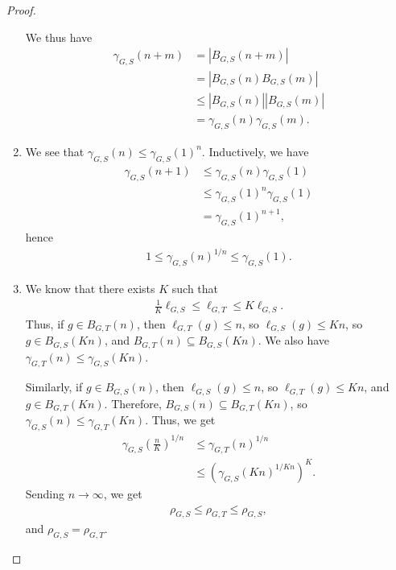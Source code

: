 \documentclass[10pt]{mypackage}
\begin{document}
\begin{proof}
\begin{enumerate}[(1)]
      We thus have
      \begin{align*}
        \gamma_{G,S}\left(n+m\right) &= \left\vert B_{G,S}\left(n+m\right) \right\vert\\
                                     &= \left\vert B_{G,S}\left(n\right)B_{G,S}\left(m\right) \right\vert\\
                                     &\leq \left\vert B_{G,S}\left(n\right) \right\vert\left\vert B_{G,S}\left(m\right) \right\vert\\
                                     &= \gamma_{G,S}\left(n\right)\gamma_{G,S}\left(m\right).
      \end{align*}
    \item We see that $\gamma_{G,S}\left(n\right) \leq \gamma_{G,S}\left(1\right)^{n}$. Inductively, we have
      \begin{align*}
        \gamma_{G,S}\left(n+1\right) &\leq \gamma_{G,S}\left(n\right)\gamma_{G,S}\left(1\right)\\
                                     &\leq \gamma_{G,S}\left(1\right)^{n}\gamma_{G,S}\left(1\right)\\
                                     &= \gamma_{G,S}\left(1\right)^{n+1},
      \end{align*}
      hence
      \begin{align*}
        1 \leq \gamma_{G,S}\left(n\right)^{1/n}\leq \gamma_{G,S}\left(1\right).
      \end{align*}
    \item We know that there exists $K$ such that
      \begin{align*}
        \frac{1}{K}\ell_{G,S} \leq \ell_{G,T} \leq K \ell_{G,S}.
      \end{align*}
      Thus, if $g\in B_{G,T}\left(n\right)$, then $\ell_{G,T}\left(g\right) \leq n$, so $\ell_{G,S}\left(g\right) \leq Kn$, so $g\in B_{G,S}\left(Kn\right)$, and $B_{G,T}\left(n\right)\subseteq B_{G,S}\left(Kn\right)$. We also have $\gamma_{G,T}\left(n\right) \leq \gamma_{G,S}\left(Kn\right)$.\newline

      Similarly, if $g\in B_{G,S}\left(n\right)$, then $\ell_{G,S}\left(g\right) \leq n$, so $\ell_{G,T}\left(g\right) \leq Kn $, and $g\in B_{G,T}\left(Kn\right)$. Therefore, $B_{G,S}\left(n\right)\subseteq B_{G,T}\left(Kn\right)$, so $\gamma_{G,S}\left(n\right)\leq \gamma_{G,T}\left(Kn\right)$. Thus, we get
      \begin{align*}
        \gamma_{G,S}\left(\frac{n}{K}\right)^{1/n} &\leq \gamma_{G,T}\left(n\right)^{1/n}\\
                                                   &\leq \left(\gamma_{G,S}\left(Kn\right)^{1/Kn}\right)^{K}.
      \end{align*}
      Sending $n\rightarrow\infty$, we get
      \begin{align*}
        \rho_{G,S} \leq \rho_{G,T}\leq \rho_{G,S},
      \end{align*}
      and $\rho_{G,S} = \rho_{G,T}$.
  \end{enumerate}
\end{proof}
\end{document}
